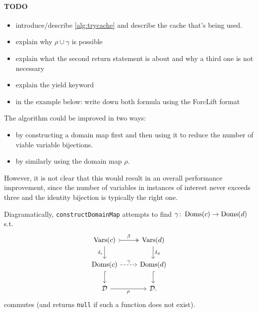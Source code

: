 \paragraph{TODO}
\begin{itemize}
\item introduce/describe \cref{alg:trycache} and describe the cache that's being used.
\item explain why $\rho \cup \gamma$ is possible
\item explain what the second return statement is about and why a third one is not necessary
\item explain the yield keyword
\item in the example below: write down both formula using the ForcLift format
\end{itemize}

The algorithm could be improved in two ways:
\begin{itemize}
\item by constructing a domain map first and then using it to reduce the number of viable variable bijections.
\item by similarly using the domain map $\rho$.
\end{itemize}
However, it is not clear that this would result in an overall performance improvement, since the number of variables in instances of interest never exceeds three and the identity bijection is typically the right one.

Diagramatically, \texttt{constructDomainMap} attempts to find $\gamma\colon \operatorname{Doms}(c) \to \operatorname{Doms}(d)$ s.t.
\begin{equation} \label{eq:commute}
\begin{tikzcd}
  \Vars(c) \ar[r, tail, two heads, "\beta"] \arrow[d, swap, "\delta_c"] & \Vars(d) \ar[d, "\delta_d"] \\
  \Doms(c) \ar[r, dashed, "\gamma"] \ar[d, hookrightarrow] & \Doms(d) \ar[d, hookrightarrow] \\
  \mathcal{D} \ar[r, swap, "\rho"] & \mathcal{D}.
\end{tikzcd}
\end{equation}
commutes (and returns \texttt{null} if such a function does not exist).

